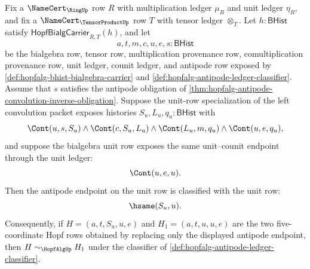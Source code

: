 \begin{theorem}
\label{thm:hopfalg-antipode-fixes-unit-row}
Fix a $\NameCert_{\RingUp}$ row $R$ with multiplication ledger $\mu_R$ and unit ledger $\eta_R$, and fix a $\NameCert_{\TensorProductUp}$ row $T$ with tensor ledger $\otimes_T$. Let $h:\mathsf{BHist}$ satisfy $\mathsf{HopfBialgCarrier}_{R,T}(h)$, and let
$$
a,t,m,c,u,e,s:\mathsf{BHist}
$$
be the bialgebra row, tensor row, multiplication provenance row, comultiplication provenance row, unit ledger, counit ledger, and antipode row exposed by \autoref{def:hopfalg-bhist-bialgebra-carrier} and \autoref{def:hopfalg-antipode-ledger-classifier}. Assume that $s$ satisfies the antipode obligation of \autoref{thm:hopfalg-antipode-convolution-inverse-obligation}. Suppose the unit-row specialization of the left convolution packet exposes histories $S_u,L_u,q_u:\mathsf{BHist}$ with
$$
\Cont(u,s,S_u)\land
\Cont(c,S_u,L_u)\land
\Cont(L_u,m,q_u)\land
\Cont(u,e,q_u),
$$
and suppose the bialgebra unit row exposes the same unit--counit endpoint through the unit ledger:
$$
\Cont(u,e,u).
$$
Then the antipode endpoint on the unit row is classified with the unit row:
$$
\hsame(S_u,u).
$$
Consequently, if $H=(a,t,S_u,u,e)$ and $H_1=(a,t,u,u,e)$ are the two five-coordinate Hopf rows obtained by replacing only the displayed antipode endpoint, then $H\sim_{\HopfAlgUp}H_1$ under the classifier of \autoref{def:hopfalg-antipode-ledger-classifier}.
\end{theorem}
